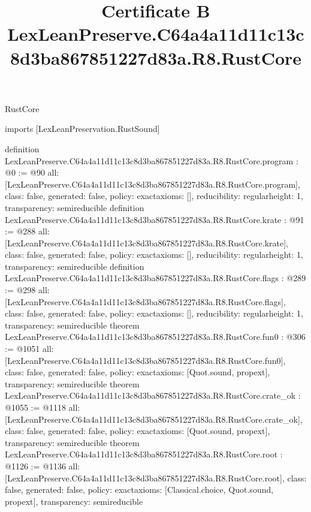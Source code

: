 \begin{lexlean}{RustCore}
\title{Certificate B LexLeanPreserve.C64a4a11d11c13c8d3ba867851227d83a.R8.RustCore}
\begin{coremodule}
imports [LexLeanPreservation.RustSound]

definition LexLeanPreserve.C64a4a11d11c13c8d3ba867851227d83a.R8.RustCore.program : @0 := @90 {
  all: [LexLeanPreserve.C64a4a11d11c13c8d3ba867851227d83a.R8.RustCore.program],
  class: false,
  generated: false,
  policy: exact{axioms: []},
  reducibility: regular{height: 1},
  transparency: semireducible
}
definition LexLeanPreserve.C64a4a11d11c13c8d3ba867851227d83a.R8.RustCore.krate : @91 := @288 {
  all: [LexLeanPreserve.C64a4a11d11c13c8d3ba867851227d83a.R8.RustCore.krate],
  class: false,
  generated: false,
  policy: exact{axioms: []},
  reducibility: regular{height: 1},
  transparency: semireducible
}
definition LexLeanPreserve.C64a4a11d11c13c8d3ba867851227d83a.R8.RustCore.flags : @289 := @298 {
  all: [LexLeanPreserve.C64a4a11d11c13c8d3ba867851227d83a.R8.RustCore.flags],
  class: false,
  generated: false,
  policy: exact{axioms: []},
  reducibility: regular{height: 1},
  transparency: semireducible
}
theorem LexLeanPreserve.C64a4a11d11c13c8d3ba867851227d83a.R8.RustCore.fun0 : @306 := @1051 {
  all: [LexLeanPreserve.C64a4a11d11c13c8d3ba867851227d83a.R8.RustCore.fun0],
  class: false,
  generated: false,
  policy: exact{axioms: [Quot.sound, propext]},
  transparency: semireducible
}
theorem LexLeanPreserve.C64a4a11d11c13c8d3ba867851227d83a.R8.RustCore.crate_ok : @1055 := @1118 {
  all: [LexLeanPreserve.C64a4a11d11c13c8d3ba867851227d83a.R8.RustCore.crate_ok],
  class: false,
  generated: false,
  policy: exact{axioms: [Quot.sound, propext]},
  transparency: semireducible
}
theorem LexLeanPreserve.C64a4a11d11c13c8d3ba867851227d83a.R8.RustCore.root : @1126 := @1136 {
  all: [LexLeanPreserve.C64a4a11d11c13c8d3ba867851227d83a.R8.RustCore.root],
  class: false,
  generated: false,
  policy: exact{axioms: [Classical.choice, Quot.sound, propext]},
  transparency: semireducible
}


\end{coremodule}
\end{lexlean}
